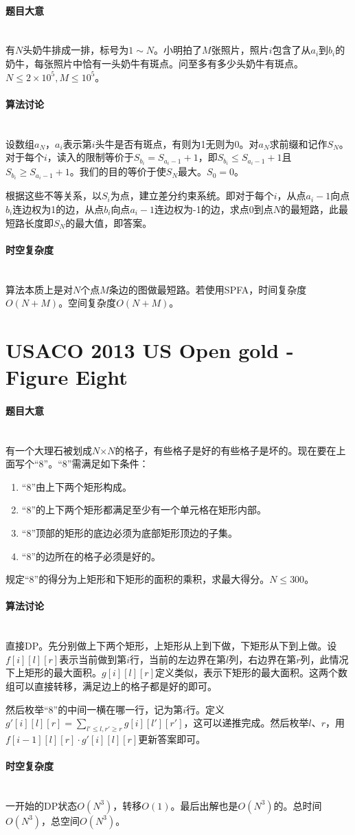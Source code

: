 \documentclass[UTF8]{ctexart}
\newcommand{\myparagraph}[1]{\paragraph{#1}\mbox{}\\}
\theoremstyle{nonumberplain}
\begin{document}
		\myparagraph{题目大意}
		
			有$N$头奶牛排成一排，标号为$1 \sim N$。小明拍了$M$张照片，照片$i$包含了从$a_i$到$b_i$的奶牛，每张照片中恰有一头奶牛有斑点。问至多有多少头奶牛有斑点。$N \leq 2 \times 10^5, M \leq 10^5$。
			
		\myparagraph{算法讨论}
		
			设数组${a_N}$，$a_i$表示第$i$头牛是否有斑点，有则为1无则为0。对${a_N}$求前缀和记作${S_N}$。对于每个$i$，读入的限制等价于$S_{b_i}=S_{a_i-1}+1$，即$S_{b_i} \leq S_{a_i-1}+1$且$S_{b_i} \geq S_{a_i-1}+1$。我们的目的等价于使$S_N$最大。$S_0=0$。
			
			根据这些不等关系，以$S_i$为点，建立差分约束系统。即对于每个$i$，从点$a_i-1$向点$b_i$连边权为1的边，从点$b_i$向点$a_i-1$连边权为-1的边，求点0到点$N$的最短路，此最短路长度即$S_N$的最大值，即答案。
	
		\myparagraph{时空复杂度}
		
			算法本质上是对$N$个点$M$条边的图做最短路。若使用SPFA，时间复杂度$O(N+M)$。空间复杂度$O(N+M)$。
	
	\section{USACO 2013 US Open gold - Figure Eight}
	
		\myparagraph{题目大意}
		
			有一个大理石被划成$N$×$N$的格子，有些格子是好的有些格子是坏的。现在要在上面写个“8”。“8”需满足如下条件：
			
			\begin{enumerate}
				\item “8”由上下两个矩形构成。
				\item “8”的上下两个矩形都满足至少有一个单元格在矩形内部。
				\item “8”顶部的矩形的底边必须为底部矩形顶边的子集。
				\item “8”的边所在的格子必须是好的。
			\end{enumerate}
			
			规定“8”的得分为上矩形和下矩形的面积的乘积，求最大得分。$N \leq 300$。
		
		\myparagraph{算法讨论}
			
			直接DP。先分别做上下两个矩形，上矩形从上到下做，下矩形从下到上做。设$f[i][l][r]$表示当前做到第$i$行，当前的左边界在第$l$列，右边界在第$r$列，此情况下上矩形的最大面积。$g[i][l][r]$定义类似，表示下矩形的最大面积。这两个数组可以直接转移，满足边上的格子都是好的即可。
			
			然后枚举“8”的中间一横在哪一行，记为第$i$行。定义$g'[i][l][r]=\sum_{l' \leq l, r' \geq r}g[i][l'][r']$，这可以递推完成。然后枚举$l$、$r$，用$f[i-1][l][r] \cdot g'[i][l][r]$更新答案即可。
		
		\myparagraph{时空复杂度}
		
			一开始的DP状态$O(N^3)$，转移$O(1)$。最后出解也是$O(N^3)$的。总时间$O(N^3)$，总空间$O(N^3)$。
	
\end{document}
